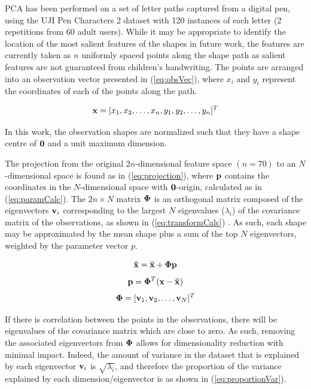 \documentclass{sig-alternate}
\begin{document}
PCA has been performed on a set of letter paths captured from a digital pen,
using the UJI Pen Characters 2 dataset \cite{Llorens2008} with 120 instances of
each letter (2 repetitions from 60 adult users). While it may be appropriate to
identify the location of the most salient features of the shapes in future work,
the features are currently taken as $n$ uniformly spaced points along the shape
path as salient features are not guaranteed from children's handwriting. The
points are arranged into an observation vector presented in (\ref{eq:obsVec}),
where $x_i$ and $y_i$ represent the coordinates of each of the points along the
path.

\begin{equation}\label{eq:obsVec}
{\bf x} = [x_1, x_2, \ldots, x_n, y_1, y_2, \ldots, y_n]^T
\end{equation}

In this work, the observation shapes are normalized such that they have a shape
centre of ${\bf 0}$ and a unit maximum dimension. 

The projection from the original $2n$-dimensional feature space $(n=70)$ to an
$N$-dimensional space is found as in (\ref{eq:projection}), where ${\bf p}$
contains the coordinates in the $N$-dimensional space with ${\bf 0}$-origin,
calculated as in (\ref{eq:paramCalc}). The $2n\times N$ matrix ${\bf \Phi }$ is
an orthogonal matrix composed of the eigenvectors ${\bf v}_i$ corresponding to
the largest $N$ eigenvalues ($\lambda_i$) of the covariance matrix of the
observations, as shown in (\ref{eq:transformCalc}) \cite{Stegmann2002}. As such,
each shape may be approximated by the mean shape plus a sum of the top $N$
eigenvectors, weighted by the parameter vector $p$. 

\begin{equation}\label{eq:projection}
{\bf \tilde{x}=\bar{x}+\Phi p}
\end{equation}
\begin{equation}\label{eq:paramCalc}
{\bf p} ={\bf \Phi}^T ({\bf {x}-\bar{x}})
\end{equation}
\begin{equation}\label{eq:transformCalc}
{\bf \Phi} = [{\bf v}_1, {\bf v}_2, \ldots, {\bf v}_N]^T
\end{equation}

If there is correlation between the points in the observations, there will be
eigenvalues of the covariance matrix which are close to zero. As such, removing
the associated eigenvectors from ${\bf \Phi}$ allows for dimensionality
reduction with minimal impact. Indeed, the amount of variance in the dataset
that is explained by each eigenvector ${\bf v}_i$ is $\sqrt{\lambda_i}$, and
therefore the proportion of the variance explained by each dimension/eigenvector
is as shown in (\ref{eq:proportionVar}).
\end{document}
